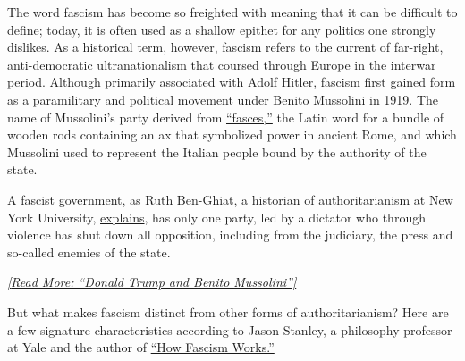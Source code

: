 The word fascism has become so freighted with meaning that it can be
difficult to define; today, it is often used as a shallow epithet for
any politics one strongly dislikes. As a historical term, however,
fascism refers to the current of far-right, anti-democratic
ultranationalism that coursed through Europe in the interwar period.
Although primarily associated with Adolf Hitler, fascism first gained
form as a paramilitary and political movement under Benito Mussolini in
1919. The name of Mussolini's party derived from
\href{http://www.classics.upenn.edu/myth/php/tools/dictionary.php?method=did\&regexp=1082\&setcard=0\&link=0\&media=0}{``fasces,''}
the Latin word for a bundle of wooden rods containing an ax that
symbolized power in ancient Rome, and which Mussolini used to represent
the Italian people bound by the authority of the state.

A fascist government, as Ruth Ben-Ghiat, a historian of authoritarianism
at New York University,
\href{https://www.npr.org/2020/07/27/895737977/what-is-fascism}{explains},
has only one party, led by a dictator who through violence has shut down
all opposition, including from the judiciary, the press and so-called
enemies of the state.

\href{https://www.theatlantic.com/politics/archive/2016/08/american-authoritarianism-under-donald-trump/495263/}{\emph{{[}Read
More: ``Donald Trump and Benito Mussolini''{]}}}

But what makes fascism distinct from other forms of authoritarianism?
Here are a few signature characteristics according to Jason Stanley, a
philosophy professor at Yale and the author of
\href{https://www.nytimes3xbfgragh.onion/2018/09/11/books/review/jason-stanley-how-fascism-works.html}{``How
Fascism Works.''}


